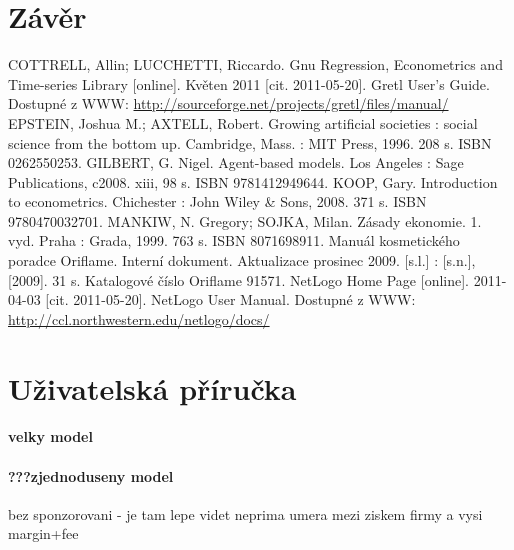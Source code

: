 \documentclass[a4wide,12pt]{report}
\begin{document}
\chapter*{Závěr}
\addtocounter{chapter}{1}
\begin{thebibliography}{9}

COTTRELL, Allin; LUCCHETTI, Riccardo. Gnu Regression, Econometrics and Time-series Library [online]. Květen 2011 [cit. 2011-05-20].  Gretl User’s Guide. Dostupné z WWW: \url{http://sourceforge.net/projects/gretl/files/manual/}
EPSTEIN, Joshua M.; AXTELL, Robert. Growing artificial societies : social science from the bottom up. Cambridge, Mass. : MIT Press,  1996. 208 s. ISBN 0262550253.
GILBERT, G. Nigel. Agent-based models. Los Angeles : Sage Publications,  c2008. xiii, 98 s. ISBN 9781412949644.
KOOP, Gary. Introduction to econometrics. Chichester : John Wiley \& Sons,  2008. 371 s. ISBN 9780470032701.
MANKIW, N. Gregory; SOJKA, Milan. Zásady ekonomie. 1. vyd. Praha : Grada,  1999. 763 s. ISBN 8071698911.
 Manuál kosmetického poradce Oriflame. Interní dokument. Aktualizace prosinec 2009. [s.l.] : [s.n.],  [2009]. 31 s. Katalogové číslo Oriflame 91571.
 NetLogo Home Page [online]. 2011-04-03 [cit. 2011-05-20].  NetLogo User Manual. Dostupné z WWW: \url{http://ccl.northwestern.edu/netlogo/docs/}
\end{thebibliography}
\chapter*{Uživatelská příručka}
\addtocounter{chapter}{1}
\subsubsection{velky model}
\subsubsection{???zjednoduseny model}
bez sponzorovani - je tam lepe videt neprima umera mezi ziskem firmy a vysi margin+fee
\end{document}
